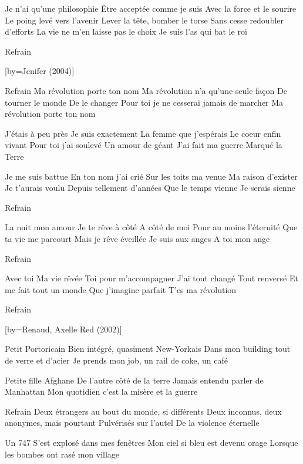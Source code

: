 \beginverse
Je n'ai qu'une philosophie
Être acceptée comme je suis
Avec la force et le sourire
Le poing levé vers l'avenir
Lever la tête, bomber le torse
Sans cesse redoubler d'efforts
La vie ne m'en laisse pas le choix
Je suis l'as qui bat le roi
\endverse

\beginverse
Refrain\\[3x]
\endverse

[by={Jenifer (2004)}]

\beginverse
Refrain
Ma révolution porte ton nom
Ma révolution n'a qu'une seule façon
De tourner le monde
De le changer
Pour toi je ne cesserai jamais de marcher
Ma révolution porte ton nom
\endverse

\beginverse
J'étais à peu près
Je suis exactement
La femme que j'espérais
Le coeur enfin vivant
Pour toi j'ai soulevé
Un amour de géant
J'ai fait ma guerre
Marqué la Terre
\endverse

\beginverse
Je me suis battue
En ton nom j'ai crié
Sur les toits ma venue
Ma raison d'exister
Je t'aurais voulu
Depuis tellement d'années
Que le temps vienne
Je serais sienne
\endverse

\beginverse
Refrain
\endverse

\beginverse
La nuit mon amour
Je te rêve à côté
A côté de moi
Pour au moins l'éternité
Que ta vie me parcourt
Mais je rêve éveillée
Je suis aux anges
A toi mon ange
\endverse

\beginverse
Refrain
\endverse

\beginverse
Avec toi
Ma vie rêvée
Toi pour m'accompagner
J'ai tout changé
Tout renversé
Et me fait tout un monde
Que j'imagine parfait
T'es ma révolution
\endverse

\beginverse
Refrain\\[bis]
\endverse

[by={Renaud, Axelle Red (2002)}]

\beginverse
Petit Portoricain
Bien intégré, quasiment New-Yorkais
Dans mon building tout de verre et d’acier
Je prends mon job, un rail de coke, un café
\endverse

\beginverse
Petite fille Afghane
De l’autre côté de la terre
Jamais entendu parler de Manhattan
Mon quotidien c’est la misère et la guerre
\endverse

\beginverse
Refrain
Deux étrangers au bout du monde, si différents
Deux inconnus, deux anonymes, mais pourtant
Pulvérisés sur l’autel
De la violence éternelle
\endverse

\beginverse
Un 747
S’est explosé dans mes fenêtres
Mon ciel si bleu est devenu orage
Lorsque les bombes ont rasé mon village
\endverse

